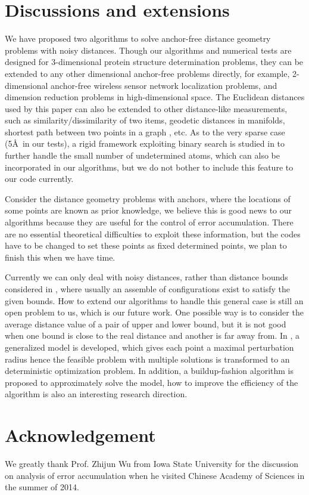 \documentclass[a4paper,12pt]{article}
\begin{document}
\section{Discussions and extensions}\label{sec:extension}
We have proposed two algorithms to solve anchor-free distance geometry problems with noisy distances. Though our algorithms and numerical tests are designed for 3-dimensional protein structure determination problems, they can be extended to any other dimensional anchor-free problems directly, for example, 2-dimensional anchor-free wireless sensor network localization problems, and dimension reduction problems in high-dimensional space. The Euclidean distances used by this paper can also be extended to other distance-like measurements, such as similarity/dissimilarity of two items, geodetic distances in manifolds, shortest path between two points in a graph \cite{Isomap2000}, etc. As to the very sparse case (5\AA ~in our tests), a rigid framework exploiting binary search is studied in \cite{Wu2008} to further handle the small number of undetermined atoms, which can also be incorporated in our algorithms, but we do not bother to include this feature to our code currently.

Consider the distance geometry problems with anchors, where the locations of some points are known as prior knowledge, we believe this is good news to our algorithms because they are useful for the control of error accumulation. There are no essential theoretical difficulties to exploit these information, but the codes have to be changed to set these points as fixed determined points, we plan to finish this when we have time.

Currently we can only deal with noisy distances, rather than distance bounds considered in \cite{Biswas2008,Fang2013,Sit2011,Voller2013}, where usually an assemble of configurations exist to satisfy the given bounds. How to extend our algorithms to handle this general case is still an open problem to us, which is our future work. One possible way is to consider the average distance value of a pair of upper and lower bound, but it is not good when one bound is close to the real distance and another is far away from. In \cite{Sit2011,Voller2013}, a generalized model is developed, which gives each point a maximal perturbation radius hence the feasible problem with multiple solutions is transformed to an deterministic optimization problem. In addition, a buildup-fashion algorithm is proposed to approximately solve the model, how to improve the efficiency of the algorithm is also an interesting research direction.


\section{Acknowledgement}
We greatly thank Prof. Zhijun Wu from Iowa State University for the      discussion on analysis of  error accumulation when he visited Chinese Academy of Sciences in the summer of 2014.


                                                 
\end{document}
